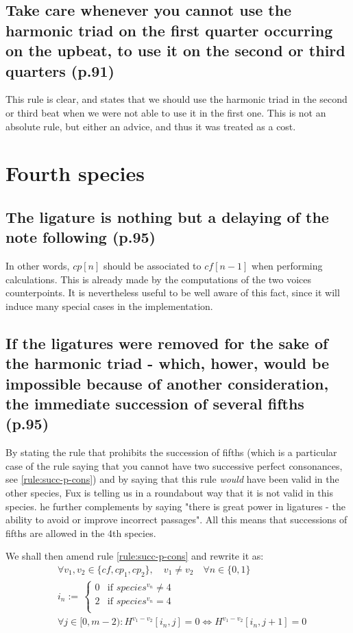 \subsection{Take care whenever you cannot use the harmonic triad on the first quarter occurring on the upbeat, to use it on the second or third quarters (p.91)}
This rule is clear, and states that we should use the harmonic triad in the second or third beat when we were not able to use it in the first one. This is not an absolute rule, but either an advice, and thus it was treated as a cost.



\section{Fourth species}
\subsection{The ligature is nothing but a delaying of the note following (p.95)}
In other words, $cp[n]$ should be associated to $cf[n-1]$ when performing calculations. This is already made by the computations of the two voices counterpoints. It is nevertheless useful to be well aware of this fact, since it will induce many special cases in the implementation.

\subsection{If the ligatures were removed for the sake of the harmonic triad - which, hower, would be impossible because of another consideration, the immediate succession of several fifths (p.95)}
By stating the rule that prohibits the succession of fifths (which is a particular case of the rule saying that you cannot have two successive perfect consonances, see \ref{rule:succ-p-cons}) and by saying that this rule \textit{would} have been valid in the other species, Fux is telling us in a roundabout way that it is not valid in this species. he further complements by saying "there is great power in ligatures - the ability to avoid or improve incorrect passages". All this means that successions of fifths are allowed in the 4th species.

We shall then amend rule \ref{rule:succ-p-cons} and rewrite it as:
\begin{equation} \begin{aligned}
    &\forall v_1, v_2 \in \{cf, cp_1, cp_2\}, \quad v_1 \neq v_2 \quad \forall n \in \{0, 1\} \\
    &i_n := \,  
    \begin{cases}
        0 & \text{if } species^{v_n} \neq 4\\
        2 & \text{if } species^{v_n} = 4\\
    \end{cases}\\
    &\forall j \in [0, m-2) \colon H^{v_1-v_2}[i_n, j] = 0 \iff H^{v_1-v_2}[i_n, j+1] = 0
\end{aligned} \end{equation}

